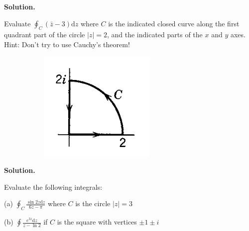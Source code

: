 \documentclass[10pt]{article}
\newcommand{\dd}{\mathrm{d}}
\begin{document}
\textbf{Solution.}

\newpage

\begin{Problem}
	
	Evaluate $\oint_C (\bar{z}-3) \dd z$ where $C$ is the indicated closed curve along the first quadrant part of the circle $|z| = 2$, and the indicated parts of the $x$ and $y$ axes. Hint: Don't try to use Cauchy's theorem!
	
\end{Problem}

\begin{figure}[h]
	\centering
	\begin{subfigure}[b]{0.1\textwidth}
		\centering
		\includegraphics[width=\textwidth]{hw4-3}
	\end{subfigure}
\end{figure}

\textbf{Solution.}

\newpage

\begin{Problem}
	
	Evaluate the following integrals:
	
	\noindent (a) $\oint_C \frac{\sin 2z \dd z}{6z-\pi}$ where $C$ is the circle $|z| = 3$
	
	\noindent (b) $\oint \frac{e^{3z} \dd z}{z - \ln 2}$ if $C$ is the square with vertices $\pm 1 \pm i$
	
\end{Problem}
\end{document}
